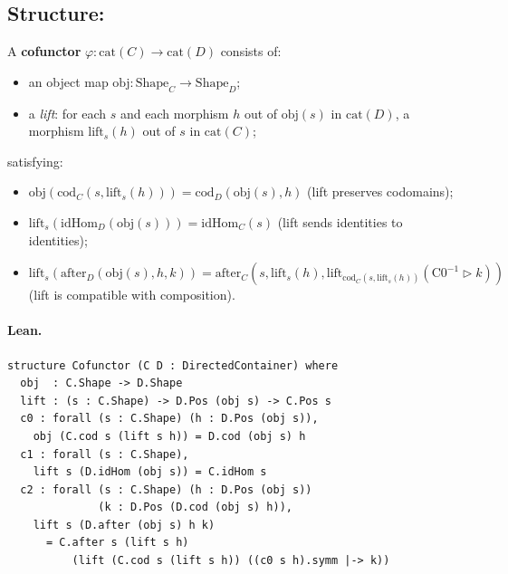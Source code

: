 \documentclass[11pt,a4paper]{article}
\begin{document}
\subsection{Structure: }

\begin{defn}[Cofunctor]
A \textbf{cofunctor} $\varphi : \mathrm{cat}(C) \to \mathrm{cat}(D)$ consists
of:
\begin{itemize}
  \item an object map $\mathrm{obj} : \mathrm{Shape}_C \to \mathrm{Shape}_D$;
  \item a \emph{lift}: for each $s$ and each morphism $h$ out of
        $\mathrm{obj}(s)$ in $\mathrm{cat}(D)$, a morphism
        $\mathrm{lift}_s(h)$ out of $s$ in $\mathrm{cat}(C)$;
\end{itemize}
satisfying:
\begin{itemize}
  \item[C0.] $\mathrm{obj}(\mathrm{cod}_C(s, \mathrm{lift}_s(h)))
             = \mathrm{cod}_D(\mathrm{obj}(s), h)$
             \hfill (lift preserves codomains);
  \item[C1.] $\mathrm{lift}_s(\mathrm{idHom}_D(\mathrm{obj}(s)))
             = \mathrm{idHom}_C(s)$
             \hfill (lift sends identities to identities);
  \item[C2.] $\mathrm{lift}_s(\mathrm{after}_D(\mathrm{obj}(s), h, k))
             = \mathrm{after}_C(s, \mathrm{lift}_s(h),
               \mathrm{lift}_{\mathrm{cod}_C(s,\mathrm{lift}_s(h))}
               (\mathrm{C0}^{-1} \triangleright k))$
             \hfill (lift is compatible with composition).
\end{itemize}
\end{defn}

\paragraph{Lean.}
\begin{lstlisting}[style=lean]
structure Cofunctor (C D : DirectedContainer) where
  obj  : C.Shape -> D.Shape
  lift : (s : C.Shape) -> D.Pos (obj s) -> C.Pos s
  c0 : forall (s : C.Shape) (h : D.Pos (obj s)),
    obj (C.cod s (lift s h)) = D.cod (obj s) h
  c1 : forall (s : C.Shape),
    lift s (D.idHom (obj s)) = C.idHom s
  c2 : forall (s : C.Shape) (h : D.Pos (obj s))
              (k : D.Pos (D.cod (obj s) h)),
    lift s (D.after (obj s) h k)
      = C.after s (lift s h)
          (lift (C.cod s (lift s h)) ((c0 s h).symm |-> k))
\end{lstlisting}
\end{document}
